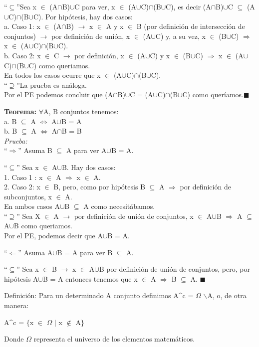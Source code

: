\documentclass[12pt]{article}
\begin{document}
\begin{center}
``$\subseteq$''Sea x $\in$ (A$\cap$B)$\cup$C para ver, x $\in$ (A$\cup$C)$\cap$(B$\cup$C), es decir (A$\cap$B)$\cup$C $\subseteq$ (A$\cup$C)$\cap$(B$\cup$C).
Por hipótesis, hay dos casos:\\
a. Caso 1: x $\in$ (A$\cap$B) $\longrightarrow$ x $\in$ A y x $\in$ B (por definición de intersección de conjuntos) $\longrightarrow$ por definición de unión, x $\in$ (A$\cup$C)
y, a su vez, x $\in$ (B$\cup$C) $\Longrightarrow$ x $\in$ (A$\cup$C)$\cap$(B$\cup$C).\\
b. Caso 2: x $\in$ C $\longrightarrow$ por definición, x $\in$ (A$\cup$C) y x $\in$ (B$\cup$C) $\Longrightarrow$ x $\in$ (A$\cup$C)$\cap$(B$\cup$C) como queriamos.\\
En todos los casos ocurre que x $\in$ (A$\cup$C)$\cap$(B$\cup$C).\\
``$\supseteq$''La prueba es análoga.\\
Por el PE podemos concluir que (A$\cap$B)$\cup$C = (A$\cup$C)$\cap$(B$\cup$C) como queríamos.$\blacksquare$\\
\end{center}
\textbf{Teorema:} $\forall$A, B conjuntos tenemos:\\
  a. B $\subseteq$ A $\Leftrightarrow$ A$\cup$B = A\\
  b. B $\subseteq$ A $\Leftrightarrow$ A$\cap$B = B\\

\textit{Prueba:}\\
``$\Rightarrow$'' Asuma B $\subseteq$ A para ver A$\cup$B = A.  
\begin{center}
``$\subseteq$'' Sea x $\in$ A$\cup$B. Hay dos casos:\\
1. Caso 1 : x $\in$ A $\Longrightarrow$ x $\in$ A.\\
2. Caso 2: x $\in$ B, pero, como por hipótesis B $\subseteq$ A $\Longrightarrow$ por definición de subconjuntos, x $\in$ A.\\
En ambos casos A$\cup$B $\subseteq$ A como necesitábamos.\\
``$\supseteq$'' Sea X $\in$ A $\longrightarrow$ por definición de unión de conjuntos, x $\in$ A$\cup$B $\Rightarrow$ A $\subseteq$ A$\cup$B como queriamos.\\
Por el PE, podemos decir que A$\cup$B = A.
\end{center}
``$\Leftarrow$'' Asuma A$\cup$B = A para ver B $\subseteq$ A.
\begin{center}
``$\subseteq$'' Sea x $\in$ B $\longrightarrow$ x $\in$ A$\cup$B por definición de unión de conjuntos, pero, por hipótesis A$\cup$B = A
entonces tenemos que x $\in$ A $\Longrightarrow$ B $\subseteq$ A. $\blacksquare$
\end{center}
Definición: Para un determinado A conjunto definimos A^c = $\varOmega$ $\backslash$A, o, de otra manera:
\begin{center}
A^c = $\{$x $\in$ $\varOmega$ $|$ x $\notin$ A$\}$
\end{center}
Donde $\varOmega$ representa el universo de los elementos matemáticos.\\
\end{document}
